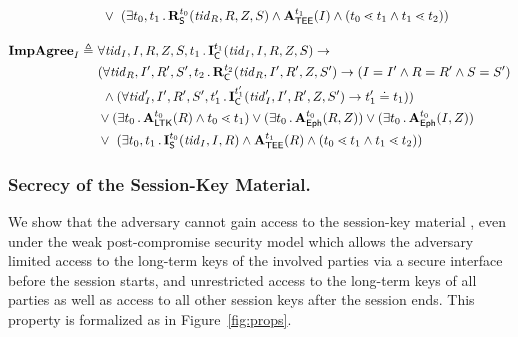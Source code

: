 \documentclass[runningheads]{llncs}
\begin{document}
\begin{figure*}[ht]
\begin{align*}
    &\ \lor\ (\exists t_0, t_1\mLogicDot \mRStart^{t_0}(\mTID_R, R, 
\mSessKey, S) \land \mTEE^{t_1}(I) \land (t_0 \lessdot t_1 \land t_1 \lessdot 
t_2))\\[1em]
%
    \mPredImpI \triangleq\ &
    \forall \mTID_I, I, R, \mSessKey, S, t_1\mLogicDot 
\mIComplete^{t_1}(\mTID_I, 
I, R, \mSessKey, 
S)
    \rightarrow\\
      &(\forall \mTID_R, I', R', S', t_2\mLogicDot \mRComplete^{t_2}(\mTID_R, 
I', R', \mSessKey, S') \rightarrow
             (I=I' \land R=R' \land S=S')\\
      &\ \land (\forall \mTID_I', I', R', S', t_1'\mLogicDot
        \mIComplete^{t_1'}(\mTID_I', I', R', \mSessKey, S') \rightarrow t_1' \doteq 
t_1
        ))\\
    &\lor(\exists t_0\mLogicDot \mRevLTK^{t_0}(R) \land t_0 \lessdot t_1)
    \lor(\exists t_0\mLogicDot \mRevEph^{t_0}(R, \mSessKey))
    \lor(\exists t_0\mLogicDot \mRevEph^{t_0}(I, \mSessKey))\\
    &\lor\ (\exists t_0, t_1\mLogicDot \mIStart^{t_0}(\mTID_I, I, R) \land 
\mTEE^{t_1}(R) \land (t_0 \lessdot t_1 \land t_1 \lessdot t_2))
\end{align*}
%
\caption{Formalization of security properties and adversary model.}
\label{fig:props}
\end{figure*}


\subsubsection{Secrecy of the Session-Key Material.}
\label{sec:secrecy}
We show that the adversary cannot gain access to the session-key material
\mSessKey{}, even under the weak post-compromise security model which allows 
the
adversary limited access to the long-term keys of the involved parties via
a
secure interface before the session starts, and unrestricted access to the long-term
keys of all parties as well as access to all other session keys after the session ends.
%
This property is formalized as \mPredPcs{} in Figure~\ref{fig:props}.
%
\end{document}
